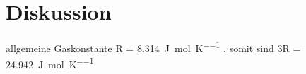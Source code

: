 \section{Diskussion}
\label{sec:Diskussion}
allgemeine Gaskonstante R = \SI{8,314}{\joule\per\mol\per\kelvin} \cite{codata}, somit sind 3R = \SI{24,942}{\joule\per\mol\per\kelvin}
